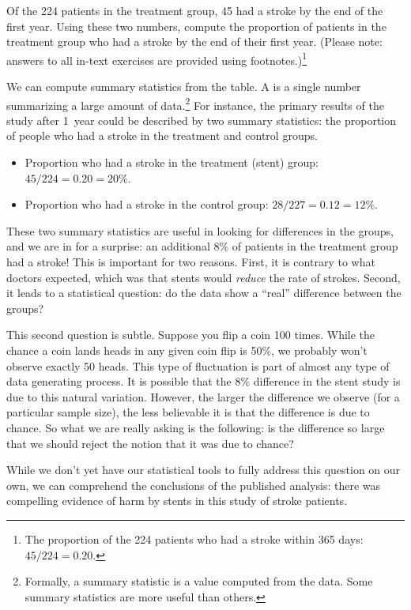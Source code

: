 \begin{exercise}
Of the 224 patients in the treatment group, 45 had a stroke by the end of the first year. Using these two numbers, compute the proportion of patients in the treatment group who had a stroke by the end of their first year. (Please note: answers to all in-text exercises are provided using footnotes.)\footnote{The proportion of the 224 patients who had a stroke within 365 days: $45/224 = 0.20$.}
\end{exercise}

We can compute summary statistics from the table. A  is a single number summarizing a large amount of data.\footnote{Formally, a summary statistic is a value computed from the data. Some summary statistics are more useful than others.} For instance, the primary results of the study after 1~year could be described by two summary statistics: the proportion of people who had a stroke in the treatment and control groups.
\begin{itemize}
\setlength{\itemsep}{0mm}
\item[] Proportion who had a stroke in the treatment (stent) group: $45/224 = 0.20 = 20\%$.
\item[] Proportion who had a stroke in the control group: $28/227 = 0.12 = 12\%$.
\end{itemize}
These two summary statistics are useful in looking for differences in the groups, and we are in for a surprise: an additional 8\% of patients in the treatment group had a stroke! This is important for two reasons. First, it is contrary to what doctors expected, which was that stents would \emph{reduce} the rate of strokes. Second, it leads to a statistical question: do the data show a ``real'' difference between the groups?

This second question is subtle. Suppose you flip a coin 100 times. While the chance a coin lands heads in any given coin flip is 50\%, we probably won't observe exactly 50 heads. This type of fluctuation is part of almost any type of data generating process. It is possible that the 8\% difference in the stent study is due to this natural variation. However, the larger the difference we observe (for a particular sample size), the less believable it is that the difference is due to chance. So what we are really asking is the following: is the difference so large that we should reject the notion that it was due to chance?

While we don't yet have our statistical tools to fully address this question on our own, we can comprehend the conclusions of the published analysis: there was compelling evidence of harm by stents in this study of stroke patients.

